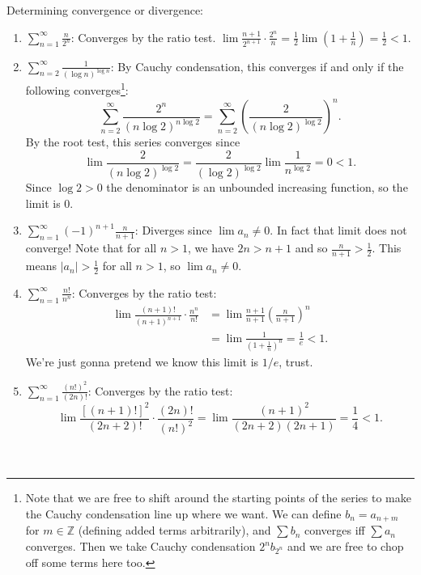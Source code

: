 \documentclass{article}
\newenvironment{problem}[1]{\renewcommand\theinnercustomprob{#1}\innercustomprob}
  {\endinnercustomprob}
\begin{document}
\newpage{}
\begin{problem}{3}
    Determining convergence or divergence:
\end{problem}
\begin{enumerate}
    \item[(a)] $\sum\limits_{n=1}^\infty \frac{n}{2^n}$: Converges by the ratio test. $\lim \frac{n+1}{2^{n+1}} \cdot \frac{2^n}{n} = \frac{1}{2}\lim (1+\frac{1}{n}) = \frac{1}{2}<1$.
    \item[(b)] $\sum\limits_{n=2}^\infty \frac{1}{(\log n)^{\log n}}$: By Cauchy condensation, this converges if and only if the following converges\footnote{Note that we are free to shift around the starting points of the series to make the Cauchy condensation line up where we want. We can define $b_n = a_{n+m}$ for $m \in \mathbb Z$ (defining added terms arbitrarily), and $\sum b_n$ converges iff $\sum a_n$ converges. Then we take Cauchy condensation $2^n b_{2^n}$ and we are free to chop off some terms here too.}: \[\sum\limits_{n=2}^\infty \frac{2^n}{(n \log 2)^{n \log 2}} = \sum_{n=2}^\infty \left(\frac{2}{(n \log 2)^{\log 2}}\right)^n.\]
    By the root test, this series converges since \[\lim \frac{2}{(n \log 2)^{\log 2}} = \frac{2}{(\log 2)^{\log 2}}\lim\frac{1}{n^{\log 2}} = 0 <1.\]
    Since $\log 2>0$ the denominator is an unbounded increasing function, so the limit is $0$.
    \item[(c)] $\sum\limits_{n=1}^\infty (-1)^{n+1} \frac{n}{n+1}$: Diverges since $\lim a_n \neq 0$. In fact that limit does not converge! Note that for all $n>1$, we have $2n> n+1$ and so $\frac{n}{n+1} > \frac{1}{2}$. This means $|a_n| > \frac{1}{2}$ for all $n > 1$, so $\lim a_n \neq 0$.
    \item[(d)] $\sum\limits_{n=1}^\infty \frac{n!}{n^n}$: Converges by the ratio test: \begin{align*} 
    \lim \frac{(n+1)!}{(n+1)^{n+1}}\cdot \frac{n^n}{n!} &= \lim \frac{n+1}{n+1}\left(\frac{n}{n+1}\right)^n \\ &= \lim \frac{1}{\left(1+\frac{1}{n}\right)^n} = \frac{1}{e} < 1.
    \end{align*}
    We're just gonna pretend we know this limit is $1/e$, trust. 
    \item[(e)] $\sum\limits_{n=1}^\infty \frac{(n!)^2}{(2n)!}$: Converges by the ratio test: \[\lim\frac{[(n+1)!]^2}{(2n+2)!}\cdot \frac{(2n)!}{(n!)^2} = \lim\frac{(n+1)^2}{(2n+2)(2n+1)} = \frac{1}{4}<1.\] \\
    \vspace{1em} \\ 

\end{enumerate}
\end{document}
